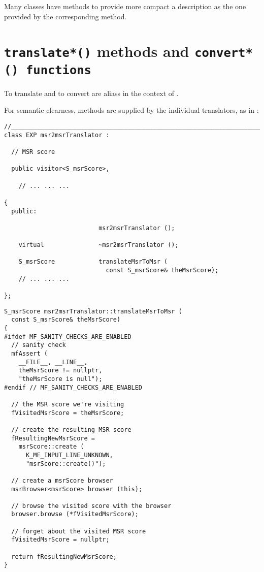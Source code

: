 Many classes have  methods to provide more compact a description as the one provided by the corresponding  method.%


\section{{\tt translate*()} methods and {\tt convert*() functions}}

To translate and to convert are aliass in the context of \mf.

For semantic clearness,  methods are supplied by the individual translators, as in :
\begin{lstlisting}[language=CPlusPlus]
//________________________________________________________________________
class EXP msr2msrTranslator :

  // MSR score

  public visitor<S_msrScore>,

	// ... ... ...

{
  public:

                          msr2msrTranslator ();

    virtual               ~msr2msrTranslator ();

    S_msrScore            translateMsrToMsr (
                            const S_msrScore& theMsrScore);
	// ... ... ...

};
\end{lstlisting}

\begin{lstlisting}[language=CPlusPlus]
S_msrScore msr2msrTranslator::translateMsrToMsr (
  const S_msrScore& theMsrScore)
{
#ifdef MF_SANITY_CHECKS_ARE_ENABLED
  // sanity check
  mfAssert (
    __FILE__, __LINE__,
    theMsrScore != nullptr,
    "theMsrScore is null");
#endif // MF_SANITY_CHECKS_ARE_ENABLED

  // the MSR score we're visiting
  fVisitedMsrScore = theMsrScore;

  // create the resulting MSR score
  fResultingNewMsrScore =
    msrScore::create (
      K_MF_INPUT_LINE_UNKNOWN,
      "msrScore::create()");

  // create a msrScore browser
  msrBrowser<msrScore> browser (this);

  // browse the visited score with the browser
  browser.browse (*fVisitedMsrScore);

  // forget about the visited MSR score
  fVisitedMsrScore = nullptr;

  return fResultingNewMsrScore;
}
\end{lstlisting}

